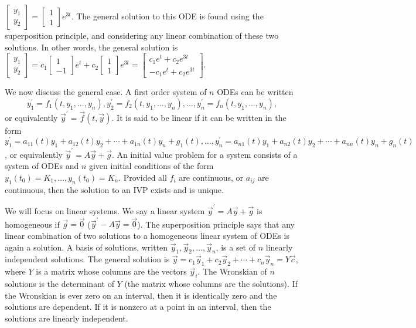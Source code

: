 $ \begin{bmatrix}y_1\\y_2\end{bmatrix} = \begin{bmatrix}1\\1\end{bmatrix}e^{3t}$.  The general solution to this ODE is found using the superposition principle, and considering any linear combination of these two solutions.  In other words, the general solution is $ \begin{bmatrix}y_1\\y_2\end{bmatrix} 
= c_1\begin{bmatrix}1\\-1\end{bmatrix}e^t 
+ c_2\begin{bmatrix}1\\1\end{bmatrix}e^{3t}
=
\begin{bmatrix}c_1e^t + c_2e^{3t}\\-c_1e^t + c_2e^{3t}\end{bmatrix}$. 

We now discuss the general case. A first order system of $n$ ODEs can be written $$y_1^\prime=f_1(t,y_1,\ldots, y_n),y_2^\prime =f_2(t,y_1,\ldots, y_n),\ldots, y_n^\prime = f_n(t,y_1,\ldots, y_n),$$ or equivalently $\vec y^\prime = \vec f(t,\vec y)$. It is said to be linear if it can be written in the form $y_1^\prime=a_{11}(t)y_1 + a_{12}(t)y_2 +\cdots + a_{1n}(t)y_n+g_1(t), \ldots, y_n^\prime=a_{n1}(t)y_1 + a_{n2}(t)y_2 +\cdots + a_{nn}(t)y_n+g_n(t)$, or equivalently $\vec y^\prime = A\vec y +\vec g$. An initial value problem for a system consists of a system of ODEs and $n$ given initial conditions of the form $y_1(t_0)=K_1, \ldots, y_n(t_0)=K_n$. Provided all $f_i$ are continuous, or $a_{ij}$ are continuous, then the solution to an IVP exists and is unique. 

We will focus on linear systems. We say a linear system $\vec y^\prime = A\vec y +\vec g$ is homogeneous if $\vec g =\vec 0$ ($\vec y^\prime -A\vec y =\vec 0$). The superposition principle says that any linear combination of two solutions to a homogeneous linear system of ODEs is again a solution.  A basis of solutions, written $\vec y_{1},\vec y_{2},\ldots, \vec y_{n}$, is a set of $n$ linearly independent solutions. The general solution is $\vec y = c_1\vec y_{1}+c_2\vec y_{2}+\cdots+c_n \vec y_{n} = Y\vec c$, where $Y$ is a matrix whose columns are the vectors $\vec y_{i}$.  The Wronskian of $n$ solutions is the determinant of $Y$ (the matrix whose columns are the solutions). If the Wronskian is ever zero on an interval, then it is identically zero and the solutions are dependent.  If it is nonzero at a point in an interval, then the solutions are linearly independent.


